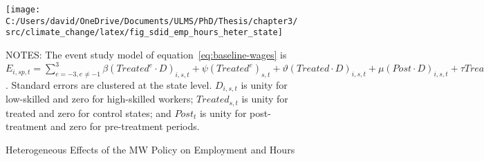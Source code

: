 \begin{figure}[H]
    \centering
    \texttt{[image: C:/Users/david/OneDrive/Documents/ULMS/PhD/Thesis/chapter3/src/climate\_change/latex/fig\_sdid\_emp\_hours\_heter\_state]}
    \caption{Heterogeneous Effects of the MW Policy on Employment and Hours}
    \label{fig:state-baseline-manufacturing-industry-employment-heter}
    \begin{minipage}{\columnwidth}
        \vspace{0.05in}
        \tiny NOTES: The event study model of equation~\ref{eq:baseline-wages} is $E_{i,sp,t} = \sum_{{e = -3},{e \neq -1}}^{3} \beta (Treated^{e} \cdot D)_{i,s,t} + \psi (Treated^{e})_{s,t} + \vartheta (Treated \cdot D)_{i,s,t} + \mu (Post \cdot D)_{i,s,t} + \tau Treated_{s,t} + \rho D_{i,s,t} + \alpha Post_{t} + \delta X_{v,s,t-1} + \omega F_{f,t} + \lambda_{t} + \sigma_{s} + \phi_{sp} + \zeta_{sp,t} + \epsilon_{i,sp,t}$. Standard errors are clustered at the state level. $D_{i,s,t}$ is unity for low-skilled and zero for high-skilled workers; $Treated_{s,t}$ is unity for treated and zero for control states; and $Post_{t}$ is unity for post-treatment and zero for pre-treatment periods.
    \end{minipage}
\end{figure}